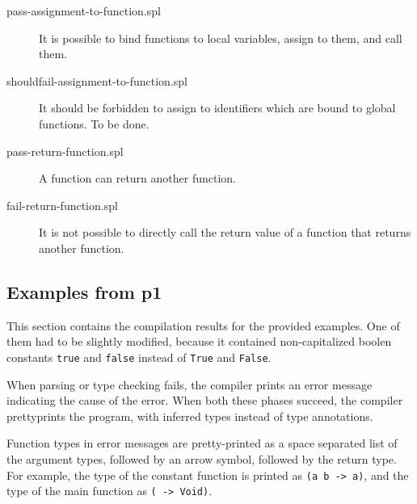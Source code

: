 \documentclass[a4paper]{article}
\begin{document}
\begin{description}
  \item[pass-assignment-to-function.spl] It is possible to bind functions to
  local variables, assign to them, and call them.

  \item[shouldfail-assignment-to-function.spl] It should be forbidden to assign
  to identifiers which are bound to global functions.  To be done.

  \item[pass-return-function.spl] A function can return another function.

  \item[fail-return-function.spl] It is not possible to directly call the return
  value of a function that returns another function.

\end{description}

\subsection{Examples from p1}

This section contains the compilation results for the provided examples.  One
of them had to be slightly modified, because it contained non-capitalized
boolen constants \texttt{true} and \texttt{false} instead of \texttt{True} and
\texttt{False}.

When parsing or type checking fails, the compiler prints an error message
indicating the cause of the error.  When both these phases succeed, the compiler
prettyprints the program, with inferred types instead of type annotations.

Function types in error messages are pretty-printed as a space separated list
of the argument types, followed by an arrow symbol, followed by the return
type.  For example, the type of the constant function is printed as \texttt{(a
b -> a)}, and the type of the main function as \texttt{( -> Void)}.
\end{document}
